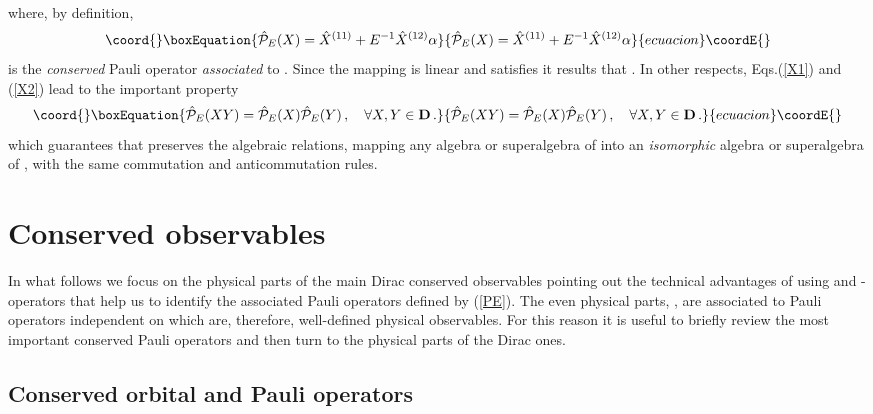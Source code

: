 \documentclass[a4paper,12pt]{article}
\begin{document}
where, by definition, 
\begin{equation}\coord{}\boxEquation{\label{PE}
\hat{\cal P}_{E}(X)=\hat X^{(11)}+ E^{-1}\hat X^{(12)}\alpha
}{\hat{\cal P}_{E}(X)=\hat X^{(11)}+ E^{-1}\hat X^{(12)}\alpha
}{ecuacion}\coordE{}\end{equation}
is the {\em conserved} Pauli operator {\em associated} to \coordHE{}. 
Since the mapping \coordHE{} is linear and 
satisfies  \coordHE{}  it results that 
\coordHE{}. 
In other respects,  Eqs.(\ref{X1}) and (\ref{X2}) lead to 
the  important property
\begin{equation}\coord{}\boxEquation{
\hat{\cal P}_{E}(XY)=  \hat{\cal P}_{E}(X)\hat{\cal P}_{E}(Y)\,, \quad \forall 
X,Y\in {\bf D}\,.
}{
\hat{\cal P}_{E}(XY)=  \hat{\cal P}_{E}(X)\hat{\cal P}_{E}(Y)\,, \quad \forall 
X,Y\in {\bf D}\,.
}{ecuacion}\coordE{}\end{equation}
which guarantees  that  \coordHE{} preserves  the algebraic 
relations, mapping any algebra or superalgebra of \coordHE{} into an 
{\em isomorphic} algebra or superalgebra of \coordHE{}, with the same 
commutation and anticommutation rules.

\section{Conserved observables}

In what follows we focus on the physical parts of the main Dirac 
conserved observables  pointing out the technical advantages 
of using \coordHE{} and \coordHE{}-operators that help us to identify the 
associated Pauli operators defined by (\ref{PE}). The even physical 
parts, \coordHE{}, are associated to Pauli operators independent on \coordHE{}  
which are, therefore, well-defined  physical observables. For this reason it 
is useful to briefly review the most important conserved Pauli operators and 
then turn to the physical parts of the Dirac  ones. 

\subsection{Conserved orbital and Pauli operators}
\end{document}

